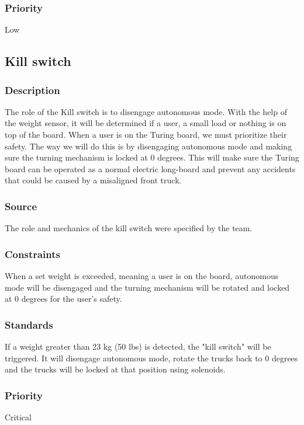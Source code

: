 \subsubsection{Priority}
Low
\subsection{Kill switch}
\subsubsection{Description}
The role of the Kill switch is to disengage autonomous mode. With the help of the weight sensor, it will be determined if a user, a small load or nothing is on top of the board. When a user is on the Turing board, we must prioritize their safety. The way we will do this is by disengaging autonomous mode and making sure the turning mechanism is locked at 0 degrees. This will make sure the Turing board can be operated as a normal electric long-board and prevent any accidents that could be caused by a misaligned front truck. 
\subsubsection{Source}
The role and mechanics of the kill switch were specified by the team.
\subsubsection{Constraints}
When a set weight is exceeded, meaning a user is on the board, autonomous mode will be disengaged and the turning mechanism will be rotated and locked at 0 degrees for the user's safety.
\subsubsection{Standards}
If a weight greater than 23 kg (50 lbs) is detected, the "kill switch" will be triggered. It will disengage autonomous mode, rotate the trucks back to 0 degrees and the trucks will be locked at that position using solenoids.
\subsubsection{Priority}
Critical